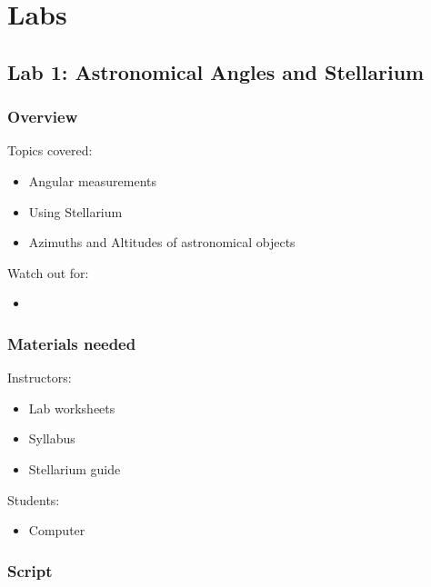\documentclass[12pt]{article}
\begin{document}
\newpage
\section{Labs}


\subsection{Lab 1: Astronomical Angles and Stellarium}

\subsubsection{Overview}

Topics covered:
\begin{itemize}
\item Angular measurements
\item Using Stellarium
\item Azimuths and Altitudes of astronomical objects
\end{itemize}

\noindent
Watch out for:
\begin{itemize}
\item 
\end{itemize}

\subsubsection{Materials needed}

Instructors:
\begin{itemize}
\item Lab worksheets
\item Syllabus
\item Stellarium guide
\end{itemize}

\noindent
Students:
\begin{itemize}
\item Computer
\end{itemize}


\subsubsection{Script}
\end{document}
